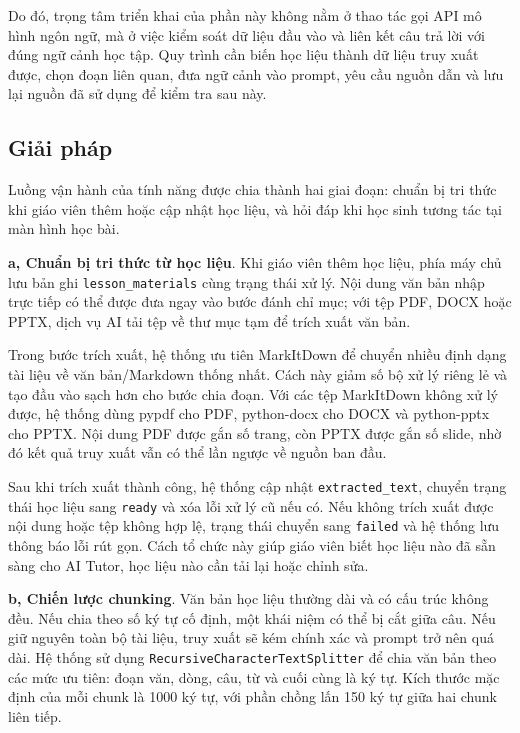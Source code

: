 \documentclass[../DoAn.tex]{subfiles}
\begin{document}
Do đó, trọng tâm triển khai của phần này không nằm ở thao tác gọi API mô hình ngôn ngữ, mà ở việc kiểm soát dữ liệu đầu vào và liên kết câu trả lời với đúng ngữ cảnh học tập. Quy trình cần biến học liệu thành dữ liệu truy xuất được, chọn đoạn liên quan, đưa ngữ cảnh vào prompt, yêu cầu nguồn dẫn và lưu lại nguồn đã sử dụng để kiểm tra sau này.

\subsection{Giải pháp}
\label{section:5.1.2}

Luồng vận hành của tính năng được chia thành hai giai đoạn: chuẩn bị tri thức khi giáo viên thêm hoặc cập nhật học liệu, và hỏi đáp khi học sinh tương tác tại màn hình học bài.

\textbf{a, Chuẩn bị tri thức từ học liệu}. Khi giáo viên thêm học liệu, phía máy chủ lưu bản ghi \texttt{lesson\_materials} cùng trạng thái xử lý. Nội dung văn bản nhập trực tiếp có thể được đưa ngay vào bước đánh chỉ mục; với tệp PDF, DOCX hoặc PPTX, dịch vụ AI tải tệp về thư mục tạm để trích xuất văn bản.

Trong bước trích xuất, hệ thống ưu tiên MarkItDown để chuyển nhiều định dạng tài liệu về văn bản/Markdown thống nhất. Cách này giảm số bộ xử lý riêng lẻ và tạo đầu vào sạch hơn cho bước chia đoạn. Với các tệp MarkItDown không xử lý được, hệ thống dùng pypdf cho PDF, python-docx cho DOCX và python-pptx cho PPTX. Nội dung PDF được gắn số trang, còn PPTX được gắn số slide, nhờ đó kết quả truy xuất vẫn có thể lần ngược về nguồn ban đầu.

Sau khi trích xuất thành công, hệ thống cập nhật \texttt{extracted\_text}, chuyển trạng thái học liệu sang \texttt{ready} và xóa lỗi xử lý cũ nếu có. Nếu không trích xuất được nội dung hoặc tệp không hợp lệ, trạng thái chuyển sang \texttt{failed} và hệ thống lưu thông báo lỗi rút gọn. Cách tổ chức này giúp giáo viên biết học liệu nào đã sẵn sàng cho AI Tutor, học liệu nào cần tải lại hoặc chỉnh sửa.

\textbf{b, Chiến lược chunking}. Văn bản học liệu thường dài và có cấu trúc không đều. Nếu chia theo số ký tự cố định, một khái niệm có thể bị cắt giữa câu. Nếu giữ nguyên toàn bộ tài liệu, truy xuất sẽ kém chính xác và prompt trở nên quá dài. Hệ thống sử dụng \texttt{RecursiveCharacterTextSplitter} để chia văn bản theo các mức ưu tiên: đoạn văn, dòng, câu, từ và cuối cùng là ký tự. Kích thước mặc định của mỗi chunk là 1000 ký tự, với phần chồng lấn 150 ký tự giữa hai chunk liên tiếp.
\end{document}
